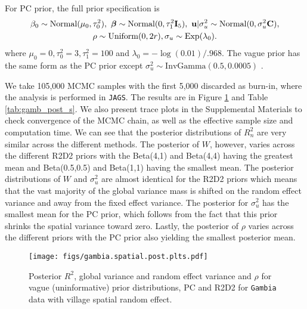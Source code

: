 \documentclass[12pt]{article}
\begin{document}
For PC prior, the full prior specification is
\begin{multline}
       \beta_0\sim\mbox{Normal}(\mu_0,\tau_0^2),\        \mbox{\boldmath $\beta$}\sim\mbox{Normal}(0,\tau_1^2\mbox{\bf I}_5),\
       {\bf u}|\sigma^2_u\sim\mbox{Normal}(0,\sigma^2_u\mbox{\bf C}),\\ \rho\sim\mbox{Uniform}(0, 2r), \sigma_u\sim \mbox{Exp}(\lambda_0).
\end{multline}
where $\mu_0=0,\tau_0^2=3,\tau_1^2=100$ and $\lambda_0=-\log(0.01)/.968$. The vague prior has the same form as the PC prior except $\sigma^2_u\sim\mbox{InvGamma}(0.5,0.0005)$ \citep{winbugs}.


We take 105,000 MCMC samples with the first 5,000 discarded as burn-in, where the analysis is performed in \texttt{JAGS}. The results are in Figure
\ref{fig:gamb.spatial.post} and Table \ref{tab:gamb_post_s}. We also present trace plots in the Supplemental Materials to check convergence of the MCMC chain, as well as the effective sample size and computation time.
We can see that the posterior distributions of $R_n^2$ are very similar across the different methods. The posterior of $W$, however, varies across the different R2D2 priors with the Beta(4,1) and Beta(4,4) having the greatest mean and Beta(0.5,0.5) and Beta(1,1) having the smallest mean. %
The posterior distributions of $W$ and $\sigma^2_u$ are almost identical for the R2D2 priors which means that the vast majority of the global variance mass is shifted on the random effect variance and away from the fixed effect variance. %
The posterior for $\sigma^2_u$ has the smallest mean for the PC prior, which follows from the fact that this prior shrinks the spatial variance toward zero. Lastly, the posterior of $\rho$ varies across the different priors with the PC prior also yielding the smallest posterior mean. %

\begin{figure}
    \centering
    \texttt{[image: figs/gambia.spatial.post.plts.pdf]}
    \caption{Posterior $R^2$, global variance and random effect variance and $\rho$ for vague (uninformative) prior distributions, PC and R2D2 for {\tt Gambia} data with village spatial random effect.}
    \label{fig:gamb.spatial.post}
\end{figure}
\end{document}
